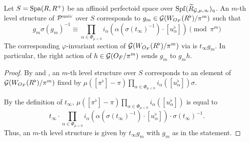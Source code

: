 \documentclass[12pt,reqno]{amsart}
\begin{document}
\begin{prop} \label{lem:levelstrCp}
    Let $S = {\operatorname{Spa}}(R,R^+)$ be an affinoid perfectoid space over ${\operatorname{Spf}}({\widetilde{R}}_{{\mathcal{G}},\mu,\infty})_\eta$. An $m$-th level structure of ${\mathcal{P}}^{\operatorname{univ}}$ over $S$ corresponds to $g_m \in {\mathcal{G}}(W_{O_F}(R^\flat)/\pi^m)$ such that 
    \begin{equation}
        g_m \sigma(g_m)^{-1} \equiv \prod_{\alpha \in \Phi_{\mu<0}} i_\alpha(\alpha(\sigma(t_\infty)^{-1})\cdot [u_\alpha^\flat]) \pmod{\pi^m}
        \label{eq:mthlevelstructure}
    \end{equation}
    The corresponding $\varphi$-invariant section of ${\mathcal{G}}(W_{O_F}(R^\flat)/\pi^m)$ via  is $t_\infty g_m$. In particular, the right action of $h \in {\mathcal{G}}(O_F / \pi^m)$ sends $g_m$ to $g_mh$. 
\end{prop}
\begin{proof}
    By  and , an $m$-th level structure over $S$ corresponds to an element of ${\mathcal{G}}(W_{O_F}(R^\flat)/\pi^m)$ fixed by $\mu([\pi^\flat]-\pi) \prod_{\alpha \in \Phi_{\mu<0}} i_\alpha([u_\alpha^\flat])\sigma$. 

    By the definition of $t_\infty$, $\mu([\pi^\flat]-\pi) \prod_{\alpha \in \Phi_{\mu<0}} i_\alpha([u_\alpha^\flat])$ is equal to 
    \[
        t_\infty \cdot\prod_{\alpha \in \Phi_{\mu<0}} i_\alpha(\alpha(\sigma(t_\infty)^{-1})\cdot [u_\alpha^\flat]) \cdot \sigma(t_\infty)^{-1}. 
    \]
    Thus, an $m$-th level structure is given by $t_\infty g_m$ with $g_m$ as in the statement. %
\end{proof}
\end{document}
